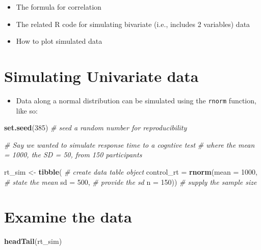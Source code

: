 \documentclass[
]{article}
\newenvironment{Shaded}{\begin{snugshade}}{\end{snugshade}}
\newcommand{\AttributeTok}[1]{\textcolor[rgb]{0.13,0.29,0.53}{#1}}
\newcommand{\CommentTok}[1]{\textcolor[rgb]{0.56,0.35,0.01}{\textit{#1}}}
\newcommand{\DecValTok}[1]{\textcolor[rgb]{0.00,0.00,0.81}{#1}}
\newcommand{\FunctionTok}[1]{\textcolor[rgb]{0.13,0.29,0.53}{\textbf{#1}}}
\newcommand{\NormalTok}[1]{#1}
\newcommand{\OtherTok}[1]{\textcolor[rgb]{0.56,0.35,0.01}{#1}}
\providecommand{\tightlist}{%
  \setlength{\itemsep}{0pt}\setlength{\parskip}{0pt}}
\begin{document}
\begin{itemize}
\tightlist
\item
  The formula for correlation
\item
  The related R code for simulating bivariate (i.e., includes 2
  variables) data
\item
  How to plot simulated data
\end{itemize}

\hypertarget{simulating-univariate-data}{%
\section{Simulating Univariate data}\label{simulating-univariate-data}}

\begin{itemize}
\tightlist
\item
  Data along a normal distribution can be simulated using the
  \texttt{rnorm} function, like so:
\end{itemize}

\begin{Shaded}
\begin{Highlighting}[]
\FunctionTok{set.seed}\NormalTok{(}\DecValTok{385}\NormalTok{) }\CommentTok{\# seed a random number for reproducibility}

\CommentTok{\# Say we wanted to simulate response time to a cogntive test}
\CommentTok{\# where the mean = 1000, the SD = 50, from 150 participants}

\NormalTok{rt\_sim }\OtherTok{\textless{}{-}} 
  \FunctionTok{tibble}\NormalTok{(                         }\CommentTok{\# create data table object}
  \AttributeTok{control\_rt =} \FunctionTok{rnorm}\NormalTok{(}\AttributeTok{mean =} \DecValTok{1000}\NormalTok{, }\CommentTok{\# state the mean }
                     \AttributeTok{sd =} \DecValTok{500}\NormalTok{,    }\CommentTok{\# provide the sd}
                     \AttributeTok{n =} \DecValTok{150}\NormalTok{))    }\CommentTok{\# supply the sample size}
\end{Highlighting}
\end{Shaded}

\hypertarget{examine-the-data}{%
\section{Examine the data}\label{examine-the-data}}

\begin{Shaded}
\begin{Highlighting}[]
\FunctionTok{headTail}\NormalTok{(rt\_sim)}
\end{Highlighting}
\end{Shaded}
\end{document}
